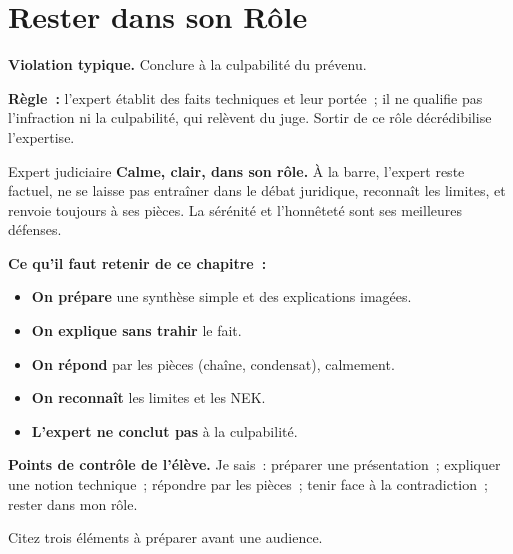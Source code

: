 \section{Rester dans son Rôle}
\label{sec:c19-role}

\begin{boxalert}
\textbf{Violation typique.} Conclure à la culpabilité du prévenu.

\smallskip
\textbf{Règle~:} l'expert établit des faits techniques et leur portée~; il ne
qualifie pas l'infraction ni la culpabilité, qui relèvent du juge. Sortir de
ce rôle décrédibilise l'expertise.
\end{boxalert}

\begin{boxmetier}{Expert judiciaire}
\textbf{Calme, clair, dans son rôle.} À la barre, l'expert reste factuel, ne
se laisse pas entraîner dans le débat juridique, reconnaît les limites, et
renvoie toujours à ses pièces. La sérénité et l'honnêteté sont ses meilleures
défenses.
\end{boxmetier}

\separateur

\begin{boxresume}
\textbf{Ce qu'il faut retenir de ce chapitre~:}
\begin{itemize}
    \item \textbf{On prépare} une synthèse simple et des explications imagées.
    \item \textbf{On explique sans trahir} le fait.
    \item \textbf{On répond} par les pièces (chaîne, condensat), calmement.
    \item \textbf{On reconnaît} les limites et les NEK.
    \item \textbf{L'expert ne conclut pas} à la culpabilité.
\end{itemize}
\end{boxresume}

\begin{boxinfo}
\textbf{Points de contrôle de l'élève.} Je sais~: préparer une présentation~;
expliquer une notion technique~; répondre par les pièces~; tenir face à la
contradiction~; rester dans mon rôle.
\end{boxinfo}

\bigskip

\begin{boxexo}[title={\ding{45}\quad Exercice~19.1. Préparer \niveaubase}]
Citez trois éléments à préparer avant une audience.
\end{boxexo}

